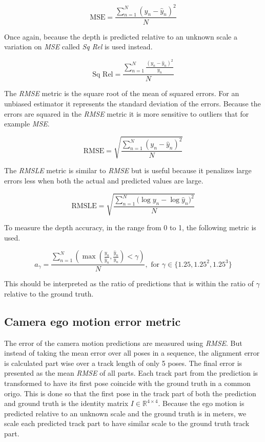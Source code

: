 \[
\textrm{MSE}=\frac{\sum^N_{n=1}{(y_n-\hat{y}_n)^2}}{N}
\]

Once again, because the depth is predicted relative to an unknown scale a variation on \textit{MSE} called \textit{Sq Rel} is used instead.

\[
\textrm{Sq Rel}=\frac{\sum^N_{n=1}{\frac{(y_n-\hat{y}_n)^2}{y_n}}}{N}
\]

The \textit{RMSE} metric is the square root of the mean of squared errors. For an unbiased estimator it represents the standard deviation of the errors. Because the errors are squared in the \textit{RMSE} metric it is more sensitive to outliers that for example \textit{MSE}.

\[
\textrm{RMSE}=\sqrt{\frac{\sum^N_{n=1}{(y_n-\hat{y}_n)^2}}{N}}
\]

The \textit{RMSLE} metric is similar to \textit{RMSE} but is useful because it penalizes large errors less when both the actual and predicted values are large.

\[
\textrm{RMSLE}=\sqrt{\frac{\sum^N_{n=1}{(\log{y_n}-\log{\hat{y}_n)}^2}}{N}}
\]

To measure the depth accuracy, in the range from 0 to 1, the following metric is used.

\[
a_{\gamma} = \frac{\sum^N_{n=1}{(\max(\frac{y_n}{\hat{y}_n}, \frac{\hat{y}_n}{y_n}) < \gamma)}}{N},\textrm{ for }\gamma \in \{1.25, 1.25^2, 1.25^3\}
\]

This should be interpreted as the ratio of predictions that is within the ratio of $ \gamma $ relative to the ground truth.

\subsection{Camera ego motion error metric}
\label{sec:egometric}

The error of the camera motion predictions are measured using \textit{RMSE}. But instead of taking the mean error over all poses in a sequence, the alignment error is calculated part wise over a track length of only 5 poses. The final error is presented as the mean \textit{RMSE} of all parts. Each track part from the prediction is transformed to have its first pose coincide with the ground truth in a common origo. This is done so that the first pose in the track part of both the prediction and ground truth is the identity matrix $I \in \mathbb{R}^{4\times 4}$. Because the ego motion is predicted relative to an unknown scale and the ground truth is in meters, we scale each predicted track part to have similar scale to the ground truth track part.

